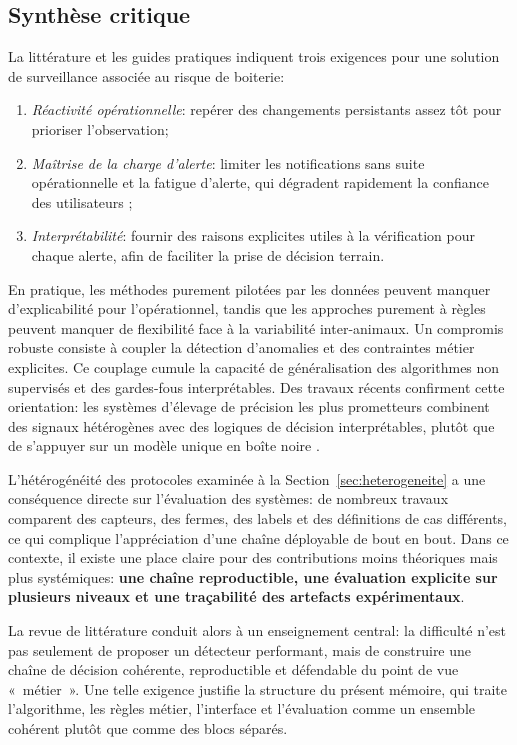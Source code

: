 \subsection{Synthèse critique}
La littérature et les guides pratiques indiquent trois exigences pour une solution de
surveillance associée au risque de boiterie:
\begin{enumerate}
  \item \textit{Réactivité opérationnelle}: repérer des changements persistants assez tôt
  pour prioriser l'observation;
  \item \textit{Maîtrise de la charge d'alerte}: limiter les notifications sans suite opérationnelle
  et la fatigue d'alerte, qui dégradent rapidement la confiance des utilisateurs
  \citep{rutten2013invited};
  \item \textit{Interprétabilité}: fournir des raisons explicites utiles à la vérification pour
  chaque alerte, afin de faciliter la prise de décision terrain.
\end{enumerate}

En pratique, les méthodes purement pilotées par les données peuvent manquer d'explicabilité pour
l'opérationnel, tandis que les approches purement à règles peuvent manquer de flexibilité
face à la variabilité inter-animaux. Un compromis robuste consiste à coupler la détection
d'anomalies et des contraintes métier explicites. Ce couplage cumule la
capacité de généralisation des algorithmes non supervisés et des gardes-fous
interprétables. Des travaux récents confirment cette orientation: les systèmes
d'élevage de précision les plus prometteurs combinent des signaux hétérogènes avec des
logiques de décision interprétables, plutôt que de s'appuyer sur un modèle unique en boîte
noire \citep{palma2025scoping,michelena2025plf_review}.

L'hétérogénéité des protocoles examinée à la Section~\ref{sec:heterogeneite} a une conséquence
directe sur l'évaluation des systèmes: de nombreux travaux comparent des capteurs, des fermes, des
labels et des définitions de cas différents, ce qui complique l'appréciation d'une chaîne
déployable de bout en bout. Dans ce contexte, il existe une place claire pour des
contributions moins théoriques mais plus systémiques: \textbf{une chaîne reproductible, une
évaluation explicite sur plusieurs niveaux et une traçabilité des artefacts expérimentaux}.

La revue de littérature conduit alors à un enseignement central: la difficulté n'est pas
seulement de proposer un détecteur performant, mais de construire une chaîne de décision
cohérente, reproductible et défendable du point de vue «~métier~». Une telle exigence justifie
la structure du présent mémoire, qui traite l'algorithme, les règles métier, l'interface et
l'évaluation comme un ensemble cohérent plutôt que comme des blocs séparés.

